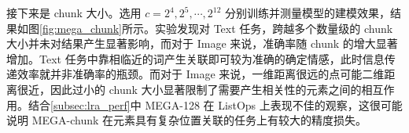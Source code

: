 接下来是 chunk 大小。选用 $c=2^4, 2^5,\cdots,2^{12}$ 分别训练并测量模型的建模效果，结果如图\ref{fig:mega_chunk}所示。实验发现对 Text 任务，跨越多个数量级的 chunk 大小并未对结果产生显著影响，而对于 Image 来说，准确率随 chunk 的增大显著增加。Text 任务中靠相临近的词产生关联即可较为准确的确定情感，此时信息传递效率就并非准确率的瓶颈。而对于 Image 来说，一维距离很远的点可能二维距离很近，因此过小的 chunk 大小显著限制了需要产生相关性的元素之间的相互作用。结合\ref{subsec:lra_perf}中 MEGA-128 在 ListOps 上表现不佳的观察，这很可能说明 MEGA-chunk 在元素具有复杂位置关联的任务上有较大的精度损失。